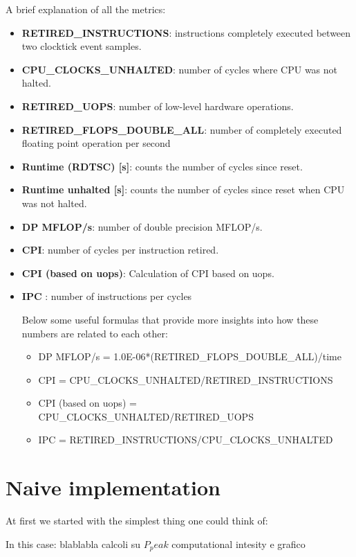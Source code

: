 \documentclass[11pt,a4paper,oneside,titlepage,openright]{book}
\begin{document}
A brief explanation of all the metrics: 

\begin{itemize}
\item{\textbf{RETIRED\_INSTRUCTIONS}: instructions completely executed between two clocktick event samples.}
\item{\textbf{CPU\_CLOCKS\_UNHALTED}: number of cycles where CPU was not halted.}
\item{\textbf{RETIRED\_UOPS}: number of low-level hardware operations.}
\item{\textbf{RETIRED\_FLOPS\_DOUBLE\_ALL}: number of completely executed floating point operation per second  }
\item{\textbf{Runtime (RDTSC) [s]}: counts the number of cycles since reset. }
\item{\textbf{Runtime unhalted [s]}: counts the number of cycles since reset when CPU was not halted.}
\item{\textbf{DP MFLOP/s}:  number of double precision MFLOP/s.}
\item{\textbf{ CPI}: number of cycles per instruction retired.}
\item{\textbf{CPI (based on uops)}: Calculation of CPI based on uops.}
\item{\textbf{ IPC }: number of instructions per cycles}

Below some useful formulas that provide more insights into how these numbers are related to each other: 
\begin{itemize}
\item DP MFLOP/s = 1.0E-06*(RETIRED\_FLOPS\_DOUBLE\_ALL)/time
\item CPI = CPU\_CLOCKS\_UNHALTED/RETIRED\_INSTRUCTIONS
\item CPI (based on uops) = CPU\_CLOCKS\_UNHALTED/RETIRED\_UOPS
\item IPC = RETIRED\_INSTRUCTIONS/CPU\_CLOCKS\_UNHALTED


\end{itemize}

\end{itemize}


\chapter{Naive implementation}
At first we started with the simplest thing one could think of:


In this case: blablabla calcoli su $P_peak$ computational intesity e grafico 
\end{document}
